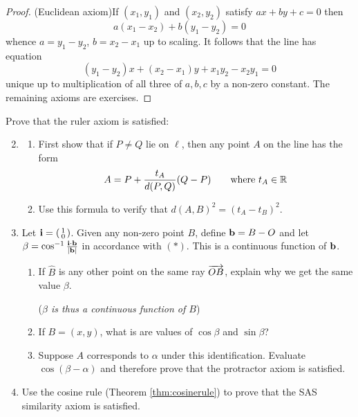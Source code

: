 \begin{proof}
	(Euclidean axiom)\quad If $(x_1,y_1)$ and $(x_2,y_2)$ satisfy $ax+by+c=0$ then
	\[
		a(x_1-x_2)+b(y_1-y_2)=0
	\]
	whence $a=y_1-y_2$, $b=x_2-x_1$ up to scaling. It follows that the line has equation
	\[
		(y_1-y_2)x+(x_2-x_1)y+x_1y_2-x_2y_1=0
	\]
	unique up to multiplication of all three of $a,b,c$ by a non-zero constant.\smallbreak
	The remaining axioms are exercises.
\end{proof}


\begin{exercises}
	\exstart Prove that the ruler axiom is satisfied:
	\begin{enumerate}\setcounter{enumi}{1}
	  \item[]\begin{enumerate}
	    \item First show that if $P\neq Q$ lie on $\ell$, then any point $A$ on the line has the form
			\[
				A=P+\frac{t_A}{d(P,Q)}(Q-P)
				\qquad\text{where }
				t_A\in\mathbb{R}
			\]
			\item Use this formula to verify that $d(A,B)^2=(t_A-t_B)^2$.
		\end{enumerate}
		
		\item Let ${\mathbf{i}}=\left(\begin{smallmatrix}1\\0\end{smallmatrix}\right)$. Given any non-zero point $B$, define ${\mathbf{b}}=B-O$ and let $\beta=\cos^{-1}\frac{{\mathbf{i}}\cdot{\mathbf{b}}}{\left| {\mathbf{b}}\right|}$ in accordance with $(\ast)$. This is a continuous function of ${\mathbf{b}}$.
		\begin{enumerate}
		  \item If $\hat B$ is any other point on the same ray $\overrightarrow{OB}$, explain why we get the same value $\beta$.\par
		  (\emph{$\beta$ is thus a continuous function of $B$})
		  \item If $B=(x,y)$, what is are values of $\cos\beta$ and $\sin\beta$?
		  \item	Suppose $A$ corresponds to $\alpha$ under this identification. Evaluate $\cos(\beta-\alpha)$ and therefore prove that the protractor axiom is satisfied.
		\end{enumerate}
		
		\item Use the cosine rule (Theorem \ref{thm:cosinerule}) to prove that the SAS similarity axiom is satisfied.
	\end{enumerate}
\end{exercises}

